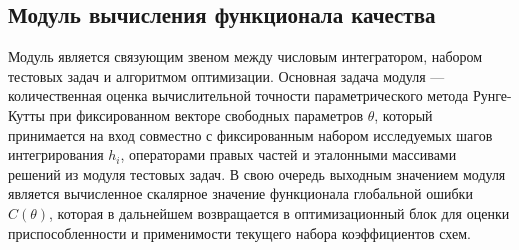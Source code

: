 		
\subsection{Модуль вычисления функционала качества}
Модуль является связующим звеном между числовым интегратором, набором тестовых задач и алгоритмом оптимизации. Основная задача модуля — количественная оценка вычислительной точности параметрического метода Рунге-Кутты при фиксированном векторе свободных параметров $\theta$, который принимается на вход совместно с фиксированным набором исследуемых шагов интегрирования $h_i$, операторами правых частей и эталонными массивами решений из модуля тестовых задач. В свою очередь выходным значением модуля является вычисленное скалярное значение функционала глобальной ошибки $C(\theta)$, которая в дальнейшем возвращается в оптимизационный блок для оценки приспособленности и применимости текущего набора коэффициентов схем.

